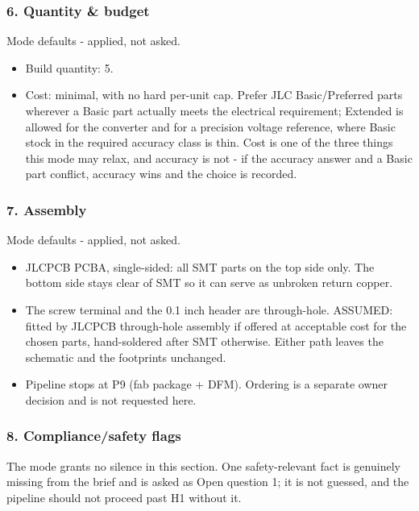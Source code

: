 \documentclass[11pt,a4paper]{article}
\begin{document}
\subsubsection*{6. Quantity \& budget}
Mode defaults - applied, not asked.

\begin{itemize}
\item Build quantity: 5.
\item Cost: minimal, with no hard per-unit cap. Prefer JLC Basic/Preferred parts
wherever a Basic part actually meets the electrical requirement; Extended is
allowed for the converter and for a precision voltage reference, where Basic
stock in the required accuracy class is thin. Cost is one of the three
things this mode may relax, and accuracy is not - if the accuracy answer and
a Basic part conflict, accuracy wins and the choice is recorded.
\end{itemize}
\subsubsection*{7. Assembly}
Mode defaults - applied, not asked.

\begin{itemize}
\item JLCPCB PCBA, single-sided: all SMT parts on the top side only. The bottom
side stays clear of SMT so it can serve as unbroken return copper.
\item The screw terminal and the 0.1 inch header are through-hole. ASSUMED: fitted
by JLCPCB through-hole assembly if offered at acceptable cost for the chosen
parts, hand-soldered after SMT otherwise. Either path leaves the schematic
and the footprints unchanged.
\item Pipeline stops at P9 (fab package + DFM). Ordering is a separate owner
decision and is not requested here.
\end{itemize}
\subsubsection*{8. Compliance/safety flags}
The mode grants no silence in this section. One safety-relevant fact is genuinely missing from the brief and is asked as Open question 1; it is not guessed, and the pipeline should not proceed past H1 without it.
\end{document}
